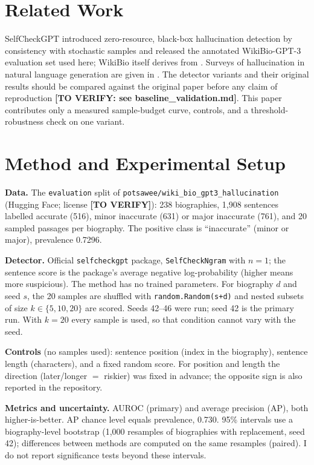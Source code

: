 \documentclass[10pt,twocolumn]{article}
\newcommand{\todo}[1]{\textbf{[#1]}}
\begin{document}
\section{Related Work}
SelfCheckGPT \cite{manakul2023selfcheckgpt} introduced zero-resource, black-box hallucination detection by consistency with stochastic samples and released the annotated WikiBio-GPT-3 evaluation set used here; WikiBio itself derives from \cite{lebret2016wikibio}. Surveys of hallucination in natural language generation are given in \cite{ji2023survey}. The detector variants and their original results should be compared against the original paper before any claim of reproduction \todo{TO VERIFY: see baseline\_validation.md}. This paper contributes only a measured sample-budget curve, controls, and a threshold-robustness check on one variant.

\section{Method and Experimental Setup}
\textbf{Data.} The \texttt{evaluation} split of \texttt{potsawee/wiki\_bio\_gpt3\_hallucination} (Hugging Face; license \todo{TO VERIFY}): 238 biographies, 1,908 sentences labelled accurate (516), minor inaccurate (631) or major inaccurate (761), and 20 sampled passages per biography. The positive class is ``inaccurate'' (minor or major), prevalence 0.7296.

\textbf{Detector.} Official \texttt{selfcheckgpt} package, \texttt{SelfCheckNgram} with $n=1$; the sentence score is the package's average negative log-probability (higher means more suspicious). The method has no trained parameters. For biography $d$ and seed $s$, the 20 samples are shuffled with \texttt{random.Random(s+d)} and nested subsets of size $k\in\{5,10,20\}$ are scored. Seeds 42--46 were run; seed 42 is the primary run. With $k=20$ every sample is used, so that condition cannot vary with the seed.

\textbf{Controls} (no samples used): sentence position (index in the biography), sentence length (characters), and a fixed random score. For position and length the direction (later/longer $=$ riskier) was fixed in advance; the opposite sign is also reported in the repository.

\textbf{Metrics and uncertainty.} AUROC (primary) and average precision (AP), both higher-is-better. AP chance level equals prevalence, 0.730. 95\% intervals use a biography-level bootstrap (1,000 resamples of biographies with replacement, seed 42); differences between methods are computed on the same resamples (paired). I do not report significance tests beyond these intervals.
\end{document}
